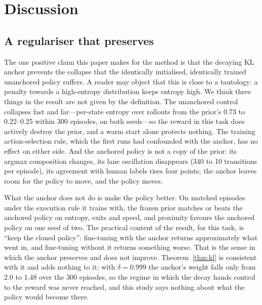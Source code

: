 \section{Discussion}
\label{sec:discussion}

\subsection{A regulariser that preserves}
\label{sec:disc_preserves}

The one positive claim this paper makes for the method is that the decaying KL anchor prevents the collapse that the identically initialised, identically trained unanchored policy suffers. A reader may object that this is close to a tautology: a penalty towards a high-entropy distribution keeps entropy high. We think three things in the result are not given by the definition. The unanchored control collapses fast and far---per-state entropy over rollouts from the prior's 0.73 to 0.22--0.25 within 300 episodes, on both seeds---so the reward in this task does actively destroy the prior, and a warm start alone protects nothing. The training action-selection rule, which the first runs had confounded with the anchor, has no effect on either side. And the anchored policy is not a copy of the prior: its argmax composition changes, its lane oscillation disappears (340 to 10 transitions per episode), its agreement with human labels rises four points; the anchor leaves room for the policy to move, and the policy moves.

What the anchor does not do is make the policy better. On matched episodes under the execution rule it trains with, the frozen prior matches or beats the anchored policy on entropy, exits and speed, and proximity favours the anchored policy on one seed of two. The practical content of the result, for this task, is ``keep the cloned policy'': fine-tuning with the anchor returns approximately what went in, and fine-tuning without it returns something worse. That is the sense in which the anchor preserves and does not improve. Theorem~\ref{thm:kl} is consistent with it and adds nothing to it; with $\delta=0.999$ the anchor's weight falls only from 2.0 to 1.48 over the 300 episodes, so the regime in which the decay hands control to the reward was never reached, and this study says nothing about what the policy would become there.

